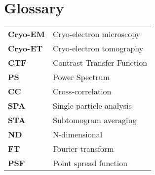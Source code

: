 \chapter{Glossary}

\renewcommand{\arraystretch}{1.5}

\begin{tabularx}{\linewidth}{>{\bf}l X}
Cryo-EM & Cryo-electron microscopy \\
Cryo-ET & Cryo-electron tomography \\
CTF & Contrast Transfer Function \\
PS & Power Spectrum \\
CC & Cross-correlation \\
SPA & Single particle analysis \\
STA & Subtomogram averaging \\
ND & N-dimensional \\
FT & Fourier transform \\
PSF & Point spread function \\
\end{tabularx}

